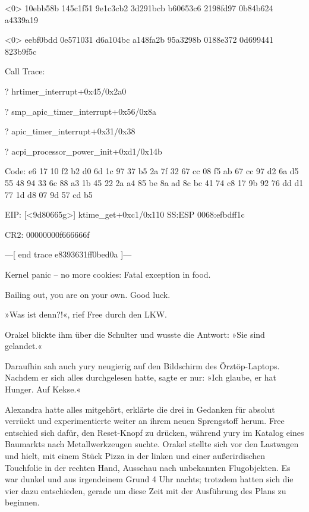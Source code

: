 \begin{tiny}
\begin{ttfamily}
\noindent [376730.313461] \textless{}0\textgreater{} 10ebb58b 145c1f51 9e1c3cb2 3d291bcb b60653c6 2198fd97 0b84b624 a4339a19

\noindent [376730.313461] \textless{}0\textgreater{} eebf0bdd 0e571031 d6a104bc a148fa2b 95a3298b 0188e372 0d699441 823b9f5c

\noindent [376730.313461] Call Trace:

 ? hrtimer\_interrupt+0x45/0x2a0

 ? smp\_apic\_timer\_interrupt+0x56/0x8a

 ? apic\_timer\_interrupt+0x31/0x38

 ? acpi\_processor\_power\_init+0xd1/0x14b

\noindent [376730.313461] Code: e6 17 10 f2 b2 d0 6d 1c 97 37 b5 2a 7f 32 67 cc 08 f5 ab 67 cc 97 d2 6a d5 55 48 94 33 6c 88 a3 1b 45 22 2a a4 85 be 8a ad 8c bc 41 74 c8 17 9b 92 76 dd d1 77 1d d8 07 9d 57 cd b5

\noindent [376730.313461] EIP: [<9d80665g\textgreater{}] ktime\_get+0xc1/0x110 SS:ESP 0068:efbdff1c

\noindent [376730.313461] CR2: 00000000f666666f

\noindent [376730.313461] ---[ end trace e8393631ff0bed0a ]---

\noindent [376730.313461] Kernel panic – no more cookies: Fatal exception in food.

\noindent [376730.313461] Bailing out, you are on your own. Good luck.

    \end{ttfamily}
    \end{tiny}



»Was ist  denn?!«, rief Free durch den LKW.

Orakel blickte ihm über die Schulter und wusste die Antwort: »Sie sind gelandet.«

Daraufhin sah auch yury neugierig auf den Bildschirm des Örztöp-Laptops. Nachdem er sich alles durchgelesen hatte, sagte er nur: »Ich glaube, er hat Hunger. Auf Kekse.«

Alexandra hatte alles mitgehört, erklärte die drei in Gedanken für absolut verrückt und experimentierte weiter an ihrem neuen Sprengstoff herum. Free entschied sich dafür, den Reset-Knopf zu drücken, während yury im Katalog eines Baumarkts nach Metallwerkzeugen suchte. Orakel stellte sich vor den Lastwagen und hielt, mit einem Stück Pizza in der linken und einer außerirdischen Touchfolie in der rechten Hand, Ausschau nach unbekannten Flugobjekten. Es war dunkel und aus irgendeinem Grund 4 Uhr nachts; trotzdem hatten sich die vier dazu entschieden, gerade um diese Zeit mit der Ausführung des Plans zu beginnen.

